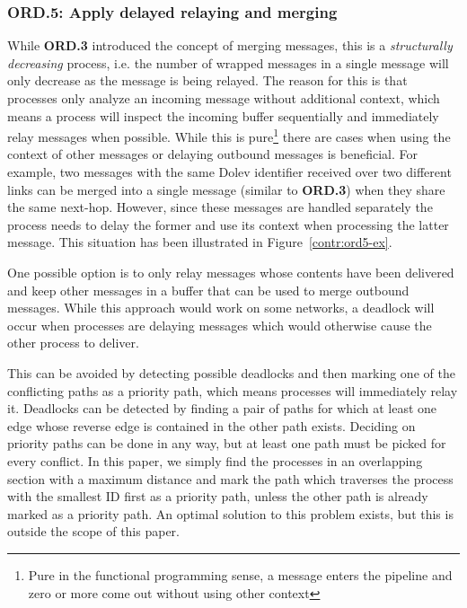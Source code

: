 \subsubsection{ORD.5: Apply delayed relaying and merging}
While \textbf{ORD.3} introduced the concept of merging messages, this is a \textit{structurally decreasing} process, i.e. the number of wrapped messages in a single message will only decrease as the message is being relayed. The reason for this is that processes only analyze an incoming message without additional context, which means a process will inspect the incoming buffer sequentially and immediately relay messages when possible.
While this is pure\footnote{Pure in the functional programming sense, a message enters the pipeline and zero or more come out without using other context} 
there are cases when using the context of other messages or delaying outbound messages is beneficial. For example, two messages with the same Dolev identifier received over two different links can be merged into a single message (similar to \textbf{ORD.3}) when they share the same next-hop. However, since these messages are handled separately the process needs to delay the former and use its context when processing the latter message. This situation has been illustrated in Figure~\ref{contr:ord5-ex}.

One possible option is to only relay messages whose contents have been delivered and keep other messages in a buffer that can be used to merge outbound messages. While this approach would work on some networks, a deadlock will occur when processes are delaying messages which would otherwise cause the other process to deliver.



This can be avoided by detecting possible deadlocks and then marking one of the conflicting paths as a priority path, which means processes will immediately relay it. Deadlocks can be detected by finding a pair of paths for which at least one edge whose reverse edge is contained in the other path exists. Deciding on priority paths can be done in any way, but at least one path must be picked for every conflict. In this paper, we simply find the processes in an overlapping section with a maximum distance and mark the path which traverses the process with the smallest ID first as a priority path, unless the other path is already marked as a priority path. An optimal solution to this problem exists, but this is outside the scope of this paper.


